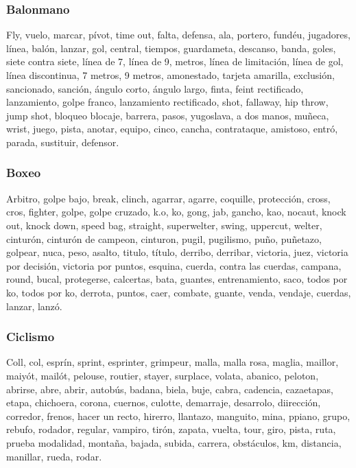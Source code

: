 \documentclass[../all.tex]{subfiles}
\begin{document}
    \subsubsection{Balonmano}
    Fly, vuelo, marcar, pívot, time out, falta, defensa, ala, portero, fundéu, jugadores, línea, balón, lanzar, gol, central, tiempos, guardameta, descanso, banda, goles, siete contra siete, línea de 7, línea de 9, metros, línea de limitación, línea de gol, línea discontinua, 7 metros, 9 metros, amonestado, tarjeta amarilla, exclusión, sancionado, sanción, ángulo corto, ángulo largo, finta, feint rectificado, lanzamiento, golpe franco, lanzamiento rectificado, shot, fallaway, hip throw, jump shot, bloqueo blocaje, barrera, pasos, yugoslava, a dos manos, muñeca, wrist, juego, pista, anotar, equipo, cinco, cancha, contrataque, amistoso, entró, parada, sustituir, defensor.
    \subsubsection{Boxeo}
    Arbitro, golpe bajo, break, clinch, agarrar, agarre, coquille, protección, cross, cros, fighter, golpe, golpe cruzado, k.o, ko, gong, jab, gancho, kao, nocaut, knock out, knock down, speed bag, straight, superwelter, swing, uppercut, welter, cinturón, cinturón de campeon, cinturon, pugil, pugilismo, puño, puñetazo, golpear, nuca, peso, asalto, titulo, título, derribo, derribar, victoria, juez, victoria por decisión, victoria por puntos, esquina, cuerda, contra las cuerdas, campana, round, bucal, protegerse, calcertas, bata, guantes, entrenamiento, saco, todos por ko, todos por ko, derrota, puntos, caer, combate, guante, venda, vendaje, cuerdas, lanzar, lanzó.
    \subsubsection{Ciclismo}
    Coll, col, esprín, sprint, esprinter, grimpeur, malla, malla rosa, maglia, maillor, maiyót, mailót, pelouse, routier, stayer, surplace, volata, abanico, peloton, abrirse, abre, abrir, autobús, badana, biela, buje, cabra, cadencia, cazaetapas, etapa, chichoera, corona, cuernos, culotte, demarraje, desarrolo, diirección, corredor, frenos, hacer un recto, hirerro, llantazo, manguito, mina, ppiano, grupo, rebufo, rodador, regular, vampiro, tirón, zapata, vuelta, tour, giro, pista, ruta, prueba modalidad, montaña, bajada, subida, carrera, obstáculos, km, distancia, manillar, rueda, rodar.
\end{document}
